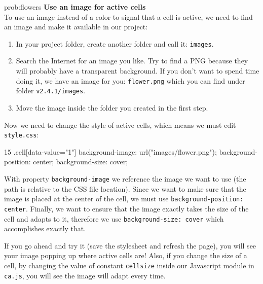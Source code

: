 \begin{sol}{prob:flowers}
\textbf{Use an image for active cells}\\
To use an image instead of a color to signal that a cell is active, we need to find an image and
make it available in our project:
\begin{enumerate}
  \item In your project folder, create another folder and call it: \texttt{images}.
  \item Search the Internet for an image you like. Try to find a PNG because they will probably have
    a transparent background. If you don't want to spend time doing it, we have an image for you:
    \texttt{flower.png} which you can find under folder \texttt{v2.4.1/images}.
  \item Move the image inside the folder you created in the first step.
\end{enumerate}
Now we need to change the style
of active cells, which means we must edit \texttt{style.css}:
\begin{codeh1}{1}{5}
.cell[data-value="1"] {
  background-image: url("images/flower.png");
  background-position: center;
  background-size: cover;
}
\end{codeh1}
With property \texttt{background-image} we reference the image we want to use (the path is relative to the
CSS file location). Since we want to make sure that the image is placed at the center of the cell, we must use
\texttt{background-position: center}. Finally, we want to ensure that the image exactly takes the size of the
cell and adapts to it, therefore we use \texttt{background-size: cover} which accomplishes exactly that.

If you go ahead and try it (save the stylesheet and refresh the page),
you will see your image popping up where active cells are! Also, if you change the size of a cell,
by changing the value of constant \texttt{cellsize} inside our Javascript module in \texttt{ca.js},
you will see the image will adapt every time.
\end{sol}

